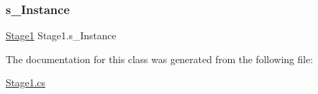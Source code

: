 \mbox{\label{class_stage1_ab20fb1804b3c34a0d5f0df630b79f48c}} 
\subsubsection{\texorpdfstring{s\+\_\+\+Instance}{s\_Instance}}
{\footnotesize\ttfamily \mbox{\hyperlink{class_stage1}{Stage1}} Stage1.\+s\+\_\+\+Instance\hspace{0.3cm}{\ttfamily [static]}}



The documentation for this class was generated from the following file\+:\begin{DoxyCompactItemize}
\item 
\mbox{\hyperlink{_stage1_8cs}{Stage1.\+cs}}\end{DoxyCompactItemize}
